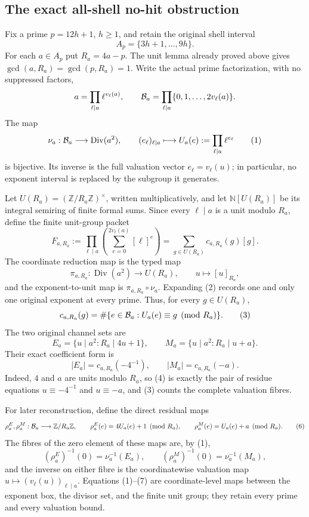 \subsection{The exact all-shell no-hit obstruction}
\label{sec:all-shell-no-hit}

Fix a prime \(p=12h+1\), \(h\geq1\), and retain the original shell interval
\[
 A_p=\{3h+1,\ldots,9h\}.
\]
For each \(a\in A_p\) put \(R_a=4a-p\). The unit lemma already
proved above gives \(\gcd(a,R_a)=\gcd(p,R_a)=1\). Write the actual
prime factorization, with no suppressed factors,
\[
 a=\prod_{\ell\mid a}\ell^{v_\ell(a)},\qquad
 {\cal B}_a=\prod_{\ell\mid a}\{0,1,\ldots,2v_\ell(a)\}.
\]
The map
\[
 \nu_a:{\cal B}_a\longrightarrow\operatorname{Div}(a^2),\qquad
 (e_\ell)_{\ell\mid a}\longmapsto U_a(e):=\prod_{\ell\mid a}\ell^{e_\ell}
 \tag{1}
\]
is bijective. Its inverse is the full valuation vector
\(e_\ell=v_\ell(u)\); in particular, no exponent interval is
replaced by the subgroup it generates.

Let \(U(R_a)=(\mathbb Z/R_a\mathbb Z)^\times\), written
multiplicatively, and let \(\mathbb N[U(R_a)]\) be its integral
semiring of finite formal sums. Since every \(\ell\mid a\) is a
unit modulo \(R_a\), define the finite unit-group packet
\[
 F_{a,R_a}:=\prod_{\ell\mid a}
   \left(\sum_{e=0}^{2v_\ell(a)}[\ell]^e\right)
 =\sum_{g\in U(R_a)}c_{a,R_a}(g)[g].
 \tag{2}
\]
The coordinate reduction map is the typed map
\[
 \pi_{a,R_a}:\operatorname{Div}(a^2)\longrightarrow U(R_a),
 \qquad u\longmapsto [u]_{R_a},
\]
and the exponent-to-unit map is $\pi_{a,R_a}\circ\nu_a$.
Expanding (2) records one and only one original exponent at every
prime. Thus, for every \(g\in U(R_a)\),
\[
 c_{a,R_a}(g)=
 \#\{e\in{\cal B}_a:U_a(e)\equiv g\pmod {R_a}\}. \tag{3}
\]
The two original channel sets are
\[
 E_a=\{u\mid a^2:R_a\mid4u+1\},\qquad
 M_a=\{u\mid a^2:R_a\mid u+a\}. \tag{4}
\]
Their exact coefficient form is
\[
 |E_a|=c_{a,R_a}(-4^{-1}),\qquad
 |M_a|=c_{a,R_a}(-a). \tag{5}
\]
Indeed, \(4\) and \(a\) are units modulo \(R_a\), so (4) is exactly
the pair of residue equations \(u\equiv-4^{-1}\) and
\(u\equiv-a\), and (3) counts the complete valuation fibres.

For later reconstruction, define the direct residual maps
\[
 \rho^E_a,\rho^M_a:{\cal B}_a\longrightarrow\mathbb Z/R_a\mathbb Z,
 \qquad
 \rho^E_a(e)=4U_a(e)+1\pmod {R_a},\qquad
 \rho^M_a(e)=U_a(e)+a\pmod {R_a}. \tag{6}
\]
The fibres of the zero element of these maps are, by (1),
\[
 (\rho^E_a)^{-1}(0)=\nu_a^{-1}(E_a),\qquad
 (\rho^M_a)^{-1}(0)=\nu_a^{-1}(M_a), \tag{7}
\]
and the inverse on either fibre is the coordinatewise valuation
map \(u\mapsto(v_\ell(u))_{\ell\mid a}\). Equations (1)--(7) are
coordinate-level maps between the exponent box, the divisor set,
and the finite unit group; they retain every prime and every
valuation bound.

